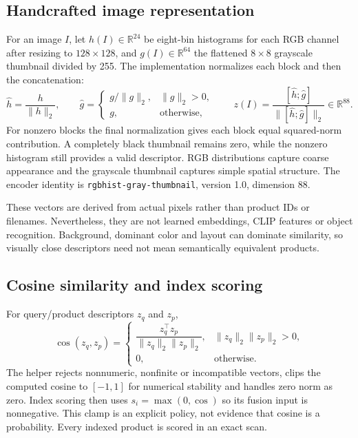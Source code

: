 \documentclass[11pt,a4paper]{article}
\begin{document}
\subsection{Handcrafted image representation}
For an image $I$, let $h(I)\in\mathbb{R}^{24}$ be eight-bin histograms for each RGB channel after resizing to $128\times128$, and $g(I)\in\mathbb{R}^{64}$ the flattened $8\times8$ grayscale thumbnail divided by 255. The implementation normalizes each block and then the concatenation:
\begin{equation}
\hat h=\frac{h}{\|h\|_2},\qquad
\hat g=\begin{cases}g/\|g\|_2,&\|g\|_2>0,\\g,&\text{otherwise},\end{cases}\qquad
z(I)=\frac{[\hat h;\hat g]}{\|[\hat h;\hat g]\|_2}\in\mathbb{R}^{88}.
\end{equation}
For nonzero blocks the final normalization gives each block equal squared-norm contribution. A completely black thumbnail remains zero, while the nonzero histogram still provides a valid descriptor. RGB distributions capture coarse appearance and the grayscale thumbnail captures simple spatial structure. The encoder identity is \texttt{rgbhist-gray-thumbnail}, version 1.0, dimension 88.

These vectors are derived from actual pixels rather than product IDs or filenames. Nevertheless, they are not learned embeddings, CLIP features or object recognition. Background, dominant color and layout can dominate similarity, so visually close descriptors need not mean semantically equivalent products.

\subsection{Cosine similarity and index scoring}
For query/product descriptors $z_q$ and $z_p$,
\begin{equation}
\operatorname{cos}(z_q,z_p)=\begin{cases}\dfrac{z_q^\top z_p}{\|z_q\|_2\|z_p\|_2},&\|z_q\|_2\|z_p\|_2>0,\\0,&\text{otherwise}.\end{cases}
\end{equation}
The helper rejects nonnumeric, nonfinite or incompatible vectors, clips the computed cosine to $[-1,1]$ for numerical stability and handles zero norm as zero. Index scoring then uses $s_i=\max(0,\operatorname{cos})$ so its fusion input is nonnegative. This clamp is an explicit policy, not evidence that cosine is a probability. Every indexed product is scored in an exact scan.
\end{document}
